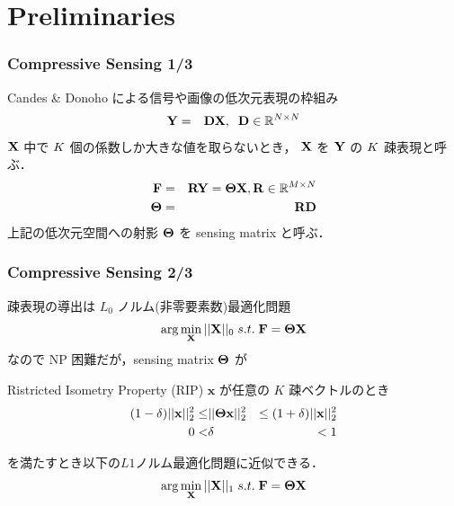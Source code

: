 \section{Preliminaries}

\begin{frame}\frametitle{Compressive Sensing 1/3}
Candes \& Donoho\cite{Donoho2006} による信号や画像の低次元表現の枠組み
\begin{eqnarray}
    {\mathbf{Y}} & = & {\mathbf{D}} {\mathbf{X}}, \;\;
    {\mathbf{D}} \in {\mathbb{R}^{N\times N}}
\end{eqnarray}
${\mathbf{X}}$ 中で $K$ 個の係数しか大きな値を取らないとき，
${\mathbf{X}}$ を ${\mathbf{Y}}$ の $K$ 疎表現と呼ぶ．
\begin{eqnarray}
    {\mathbf{F}} & = & {\mathbf{R}} {\mathbf{Y}} = {\mathbf{\Theta}} {\mathbf{X}},
    {\mathbf{R}} \in {\mathbb{R}^{M\times N}} \\
    {\mathbf{\Theta}} & = & {\mathbf{R}} {\mathbf{D}}
\end{eqnarray}
上記の低次元空間への射影 ${\mathbf{\Theta}}$ を sensing matrix と呼ぶ．
\end{frame}


\begin{frame}\frametitle{Compressive Sensing 2/3}
疎表現の導出は $L_0$ ノルム(非零要素数)最適化問題
\begin{equation}
    \arg\min_{{\mathbf{X}}} ||{\mathbf{X}}||_0 \; s.t. \; {\mathbf{F}} = {\mathbf{\Theta}} {\mathbf{X}}
\end{equation}
なので NP 困難だが，sensing matrix ${\mathbf{\Theta}}$ が
\begin{block}{Ristricted Isometry Property (RIP)}
$\mathbf{x}$ が任意の $K$ 疎ベクトルのとき
\begin{eqnarray}
    (1 - \delta) ||\mathbf{x}||^2_2 \leq & || {\mathbf{\Theta}} \mathbf{x} 
    ||^2_2 & \leq (1 + \delta) ||\mathbf{x}||^2_2 \\
    0 < & \delta & < 1
\end{eqnarray}
\end{block}
を満たすとき以下の$L1$ノルム最適化問題に近似できる\cite{Candes2008}．
\begin{equation}
    \arg\min_{{\mathbf{X}}}  ||{\mathbf{X}}||_1 \; s.t. \; {\mathbf{F}} = {\mathbf{\Theta}} {\mathbf{X}}
\end{equation}
\end{frame}


